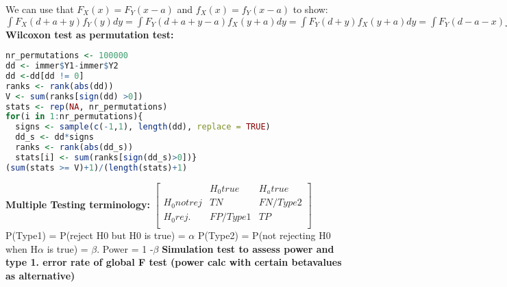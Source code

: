 We can use that $F_X(x)=F_Y(x-a)$ and $f_X(x)=f_Y(x-a)$ to show: $\int F_X(d+a+y)f_Y(y)dy = \int F_Y(d+a+y-a)f_X(y+a)dy = \int F_Y(d+y)f_X(y+a)dy = \int F_Y(d-a-x)f_X(x)dx$ \\
\textbf{Wilcoxon test as permutation test:} 
\begin{lstlisting}[language=R]
nr_permutations <- 100000
dd <- immer$Y1-immer$Y2
dd <-dd[dd != 0]
ranks <- rank(abs(dd))
V <- sum(ranks[sign(dd) >0])
stats <- rep(NA, nr_permutations)
for(i in 1:nr_permutations){
  signs <- sample(c(-1,1), length(dd), replace = TRUE)
  dd_s <- dd*signs
  ranks <- rank(abs(dd_s))
  stats[i] <- sum(ranks[sign(dd_s)>0])}
(sum(stats >= V)+1)/(length(stats)+1)

\end{lstlisting}
\textbf{Multiple Testing terminology:}
$\begin{bmatrix}
& H_0 true & H_a true \\
H_0 not rej & TN & FN/Type2\\
H_0rej. & FP/Type1 & TP \\
\end{bmatrix}$\\
P(Type1) = P(reject H0 but H0 is true) = $\alpha$
P(Type2) = P(not rejecting H0 when H$\alpha$ is true) = $\beta$. Power = 1 -$\beta$
\textbf{Simulation test to assess power and type 1. error rate of global F test (power calc with certain betavalues as alternative)}


